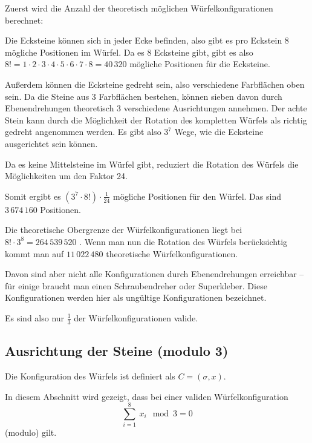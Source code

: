 \documentclass[12pt,a4paper, usenames, dvipsnames]{article}
\begin{document}
Zuerst wird die Anzahl der theoretisch möglichen Würfelkonfigurationen berechnet:


Die Ecksteine können sich in jeder Ecke befinden, also gibt es pro Eckstein 8 mögliche Positionen im Würfel. Da es 8 Ecksteine gibt, gibt es also $8! = 1 \cdot 2 \cdot 3 \cdot 4 \cdot 5 \cdot 6 \cdot 7 \cdot 8 = 40\, 320$ mögliche Positionen für die Ecksteine.


Außerdem können die Ecksteine gedreht sein, also verschiedene Farbflächen oben sein. Da die Steine aus 3 Farbflächen bestehen, können sieben davon durch Ebenendrehungen theoretisch 3 verschiedene Ausrichtungen annehmen. Der achte Stein kann durch die Möglichkeit der Rotation des kompletten Würfels als richtig gedreht angenommen werden. Es gibt also $3^7$ Wege, wie die Ecksteine ausgerichtet sein können.


Da es keine Mittelsteine im Würfel gibt, reduziert die Rotation des Würfels die Möglichkeiten um den Faktor 24. 


Somit ergibt es $(3^7 \cdot 8!) \cdot \frac{1}{24}$ mögliche Positionen für den Würfel. Das sind $3\, 674\, 160$ Positionen.


Die theoretische Obergrenze der Würfelkonfigurationen liegt bei $8! \cdot 3^8 = 264 \, 539 \, 520$ \cite{MMFAA}. Wenn man nun die Rotation des Würfels berücksichtig kommt man auf $11 \, 022 \, 480$ theoretische Würfelkonfigurationen.


Davon sind aber nicht alle Konfigurationen durch Ebenendrehungen erreichbar -- für einige braucht man einen Schraubendreher oder Superkleber. Diese Konfigurationen werden hier als ungültige Konfigurationen bezeichnet. 


Es sind also nur $\frac{1}{3}$ der Würfelkonfigurationen valide.
%
%
%
%
%
%
%
%
%
%
%
%
%
%
%
%
%
%
%
%
\subsection*{Ausrichtung der Steine (modulo 3)}

Die Konfiguration des Würfels ist definiert als $C=(\sigma, x)$. 


In diesem Abschnitt wird gezeigt, dass bei einer validen Würfelkonfiguration \begin{displaymath}
\sum_{i= 1}^{8} \ x_i \mod 3 = 0 
\end{displaymath}  (modulo) gilt. 
\end{document}
